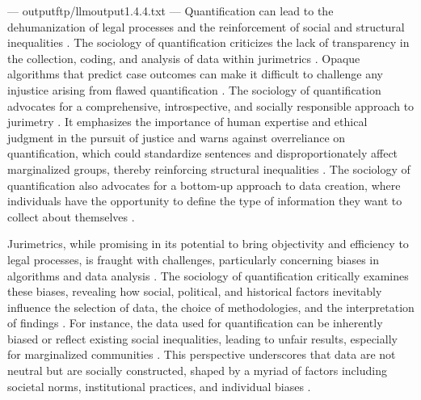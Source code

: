 ---
outputftp/llmoutput1.4.4.txt
---
Quantification can lead to the dehumanization of legal processes and the reinforcement of social and structural inequalities \cite{10.1590/dados.2022.65.3.267,10.1007/978-3-319-44000-215,10.5040/9781350220645,10.1080/07329113.2015.1046739,de2010jurimetrics}. The sociology of quantification criticizes the lack of transparency in the collection, coding, and analysis of data within jurimetrics \cite{10.1590/dados.2022.65.3.267,10.1007/978-3-319-44000-215,10.5040/9781350220645,10.3390/fi9040068,10.1057/s41599-020-0396-5,unger2021process}. Opaque algorithms that predict case outcomes can make it difficult to challenge any injustice arising from flawed quantification \cite{10.1590/dados.2022.65.3.267,10.1007/978-3-319-44000-215,10.5040/9781350220645,10.3390/fi9040068,10.1057/s41599-020-0396-5,unger2021process}. The sociology of quantification advocates for a comprehensive, introspective, and socially responsible approach to jurimetry \cite{10.1590/dados.2022.65.3.267,10.1007/978-3-319-44000-215,10.5040/9781350220645,10.1080/07329113.2015.1046739,nunes2016jurimetrics}. It emphasizes the importance of human expertise and ethical judgment in the pursuit of justice and warns against overreliance on quantification, which could standardize sentences and disproportionately affect marginalized groups, thereby reinforcing structural inequalities \cite{10.1590/dados.2022.65.3.267,10.1057/s41599-020-00557-0}. The sociology of quantification also advocates for a bottom-up approach to data creation, where individuals have the opportunity to define the type of information they want to collect about themselves \cite{10.1590/dados.2022.65.3.267}.

Jurimetrics, while promising in its potential to bring objectivity and efficiency to legal processes, is fraught with challenges, particularly concerning biases in algorithms and data analysis \cite{10.1590/dados.2022.65.3.267,10.32586/rcda.v18i1.585}. The sociology of quantification critically examines these biases, revealing how social, political, and historical factors inevitably influence the selection of data, the choice of methodologies, and the interpretation of findings \cite{10.1590/dados.2022.65.3.267,10.32586/rcda.v18i1.585}. For instance, the data used for quantification can be inherently biased or reflect existing social inequalities, leading to unfair results, especially for marginalized communities \cite{10.1590/dados.2022.65.3.267,10.1057/s41599-020-00557-0}. This perspective underscores that data are not neutral but are socially constructed, shaped by a myriad of factors including societal norms, institutional practices, and individual biases \cite{10.1057/s41599-020-00557-0, salais2016quantification}.

